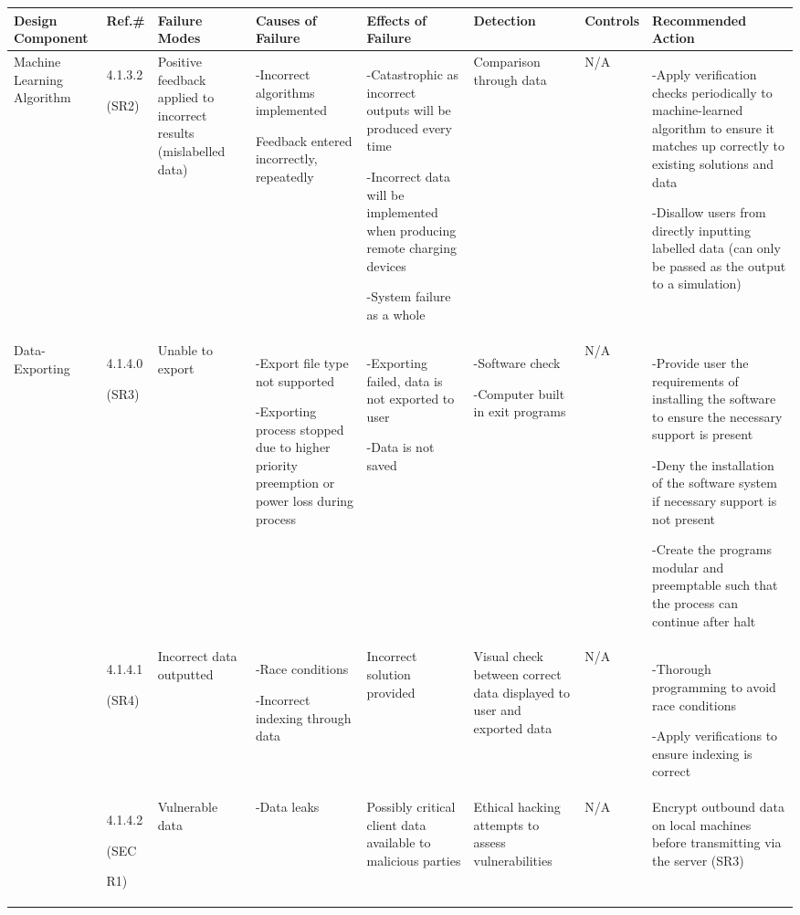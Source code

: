 \documentclass[12pt, titlepage]{article}
\begin{document}
\begin{center}
\begin{adjustwidth}{-3.5cm}{}
\begin{tabular}{|p{1.6cm}|p{1cm}|p{1.8cm}|p{2.4cm}|p{3cm}|p{1.7cm}|p{1.5cm}|p{4.5cm}|}
\hline
Design Component & Ref.\# & Failure Modes & Causes of Failure & Effects of Failure & Detection & Controls & Recommended Action\\
\hline
Machine Learning Algorithm & 4.1.3.2 \par (SR2) & Positive feedback applied to incorrect results (mislabelled data) & -Incorrect algorithms implemented \par Feedback entered incorrectly, repeatedly & -Catastrophic as incorrect outputs will be produced every time \par -Incorrect data will be implemented when producing remote charging devices \par -System failure as a whole & Comparison through data & N/A & -Apply verification checks periodically to machine-learned algorithm to ensure it matches up correctly to existing solutions and data \par -Disallow users from directly inputting labelled data (can only be passed as the output to a simulation)\\
\hline
Data-Exporting & 4.1.4.0 \par(SR3)& Unable to export & -Export file type not supported \par -Exporting process stopped due to higher priority preemption or power loss during process & -Exporting failed, data is not exported to user \par -Data is not saved & -Software check \par -Computer built in exit programs & N/A & -Provide user the requirements of installing the software to ensure the necessary support is present \par -Deny the installation of the software system if necessary support is not present \par -Create the programs modular and preemptable such that the process can continue after halt\\
& 4.1.4.1 \par (SR4)& Incorrect data outputted & -Race conditions \par -Incorrect indexing through data &  Incorrect solution provided &Visual check between correct data displayed to user and exported data & N/A & -Thorough programming to avoid race conditions \par -Apply verifications to ensure indexing is correct\\
&4.1.4.2 \par(SEC\par R1)& Vulnerable data & -Data leaks & Possibly critical client data available to malicious parties & Ethical hacking attempts to assess vulnerabilities & N/A & Encrypt outbound data on local machines before transmitting via the server (SR3)\\
\hline 
\end{tabular}
\end{adjustwidth}
\end{center}
\end{document}
